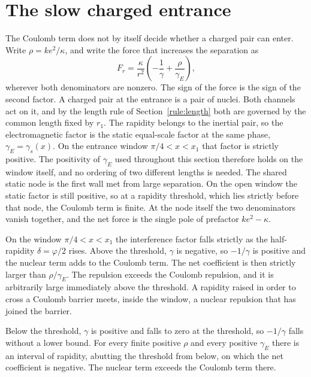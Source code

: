 \documentclass[a4paper]{article}
\begin{document}
\section{The slow charged entrance}
\label{sec:cold}

The Coulomb term does not by itself decide whether a charged pair can enter. Write \(\rho=k e^{2}/\kappa\), and write the force that increases the separation as
\begin{equation}
\label{eq:charged-net}
F_r
  =\frac{\kappa}{r^{2}}
  \left(-\frac{1}{\gamma}+\frac{\rho}{\gamma_E}\right),
\end{equation}
wherever both denominators are nonzero. The sign of the force is the sign of the second factor. A charged pair at the entrance is a pair of nuclei. Both channels act on it, and by the length rule of Section~\ref{rule:length} both are governed by the common length fixed by \(r_1\). The rapidity belongs to the inertial pair, so the electromagnetic factor is the static equal-scale factor at the same phase, \(\gamma_E=\gamma_s(x)\). On the entrance window \(\pi/4<x<x_1\) that factor is strictly positive. The positivity of \(\gamma_E\) used throughout this section therefore holds on the window itself, and no ordering of two different lengths is needed. The shared static node is the first wall met from large separation. On the open window the static factor is still positive, so at a rapidity threshold, which lies strictly before that node, the Coulomb term is finite. At the node itself the two denominators vanish together, and the net force is the single pole of prefactor \(ke^{2}-\kappa\).

On the window \(\pi/4<x<x_1\) the interference factor falls strictly as the half-rapidity \(\delta=\varphi/2\) rises. Above the threshold, \(\gamma\) is negative, so \(-1/\gamma\) is positive and the nuclear term adds to the Coulomb term. The net coefficient is then strictly larger than \(\rho/\gamma_E\). The repulsion exceeds the Coulomb repulsion, and it is arbitrarily large immediately above the threshold. A rapidity raised in order to cross a Coulomb barrier meets, inside the window, a nuclear repulsion that has joined the barrier.

Below the threshold, \(\gamma\) is positive and falls to zero at the threshold, so \(-1/\gamma\) falls without a lower bound. For every finite positive \(\rho\) and every positive \(\gamma_E\) there is an interval of rapidity, abutting the threshold from below, on which the net coefficient is negative. The nuclear term exceeds the Coulomb term there.
\end{document}
